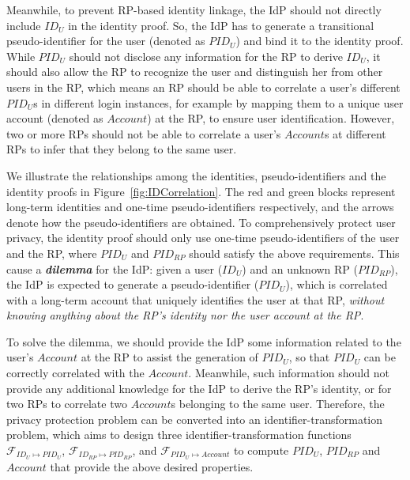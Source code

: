 Meanwhile, to prevent RP-based identity linkage, the IdP should not directly include $ID_U$ in the identity proof. So, the IdP has to generate a transitional pseudo-identifier for the user (denoted as $PID_U$) and bind it to the identity proof. While $PID_U$ should not disclose any information for the RP to derive $ID_U$, it should also allow the RP to recognize the user and distinguish her from other users in the RP, which means an RP should be able to correlate a user's different $PID_U$s in different login instances, for example by mapping them to a unique user account (denoted as $Account$) at the RP, to ensure user identification. However, two or more RPs should not be able to correlate a user's $Account$s at different RPs to infer that they belong to the same user.

We illustrate the relationships among the identities, pseudo-identifiers and the identity proofs in Figure~\ref{fig:IDCorrelation}. The red and green blocks represent long-term identities and one-time pseudo-identifiers respectively, and the arrows denote how the pseudo-identifiers are obtained. To comprehensively protect user privacy, the identity proof should only use one-time pseudo-identifiers of the user and the RP, where $PID_U$ and $PID_{RP}$ should satisfy the above requirements. This cause a \textbf{\em dilemma} for the IdP: given a user ($ID_U$) and an unknown RP ($PID_{RP}$), the IdP is expected to generate a pseudo-identifier ($PID_{U}$), which is correlated with a long-term account that uniquely identifies the user at that RP, {\em without knowing anything about the RP's identity nor the user account at the RP}.

To solve the dilemma, we should provide the IdP some information related to the user's $Account$ at the RP to assist the generation of $PID_U$, so that $PID_U$ can be correctly correlated with the $Account$. Meanwhile, such information should not provide any additional knowledge for the IdP to derive the RP's identity, or for two RPs to correlate two $Account$s belonging to the same user. Therefore, the privacy protection problem can be converted into an identifier-transformation problem, which aims to design three identifier-transformation functions $\mathcal{F}_{ID_{U} \mapsto PID_U}$, $\mathcal{F}_{ID_{RP} \mapsto PID_{RP}}$, and $\mathcal{F}_{PID_{U} \mapsto Account}$ to compute $PID_U$, $PID_{RP}$ and $Account$ that provide the above desired properties.

